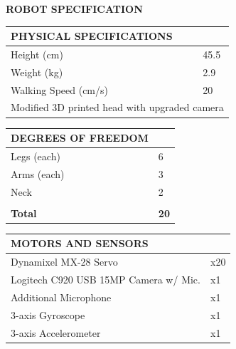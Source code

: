 \documentclass[10pt,a4paper]{article}
\begin{document}
\begin{center}
	\colorbox[rgb]{0.0, 0.0, 0.0}
	{
	\begin{minipage}[c][3em][c]{\textwidth}
		{\color{textcolour}
			{
			\begin{Large}
				\textbf{ROBOT SPECIFICATION}
			\end{Large}
			}
		}
	\end{minipage}
	}
\end{center}

\begin{multicols}{2}
\begin{table}[H]
	\begin{tabular}{|m{5.7cm}|m{1.15cm}|}
		\hline
		\rowcolor[rgb]{0.0, 0.0, 0.0}
		{\color{textcolour}\textbf{{PHYSICAL SPECIFICATIONS}}} & \\
		\hline
		Height (cm) & 45.5 \\
		\hline
		Weight (kg) & 2.9 \\
		\hline
		Walking Speed (cm/s) & 20 \\
		\hline
		\multicolumn{2}{|l|}{Modified 3D printed head with upgraded camera} \\
		\hline
	\end{tabular}
\end{table}

\begin{table}[H]
	\begin{tabular}{|m{5.7cm}|m{1.15cm}|}
		\hline
		\rowcolor[rgb]{0.0, 0.0, 0.0}
		{\color{textcolour}\textbf{{DEGREES OF FREEDOM}}} & \\
		\hline
		Legs (each) & 6 \\
		\hline
		Arms (each) & 3 \\
		\hline
		Neck & 2 \\
		\hline
		& \\
		\hline
		\textbf{Total} & \textbf{20} \\
		\hline
	\end{tabular}
\end{table}

\begin{table}[H]
	\begin{tabular}{|m{5.7cm}|m{1.15cm}|}
		\hline
		\rowcolor[rgb]{0.0, 0.0, 0.0}
		{\color{textcolour}\textbf{{MOTORS AND SENSORS}}} & \\
		\hline
		Dynamixel MX-28 Servo & x20 \\
		\hline
		Logitech C920 USB 15MP Camera w/ Mic. & x1 \\
		\hline
		Additional Microphone & x1 \\
		\hline
		3-axis Gyroscope & x1 \\
		\hline
		3-axis Accelerometer & x1 \\
		\hline
	\end{tabular}
\end{table}


\end{multicols}
\end{document}
